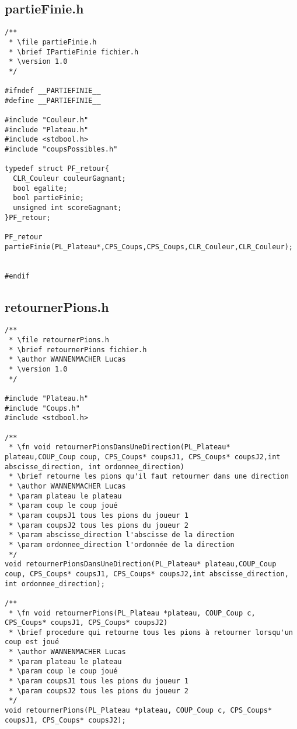 \subsection{partieFinie.h}
\begin{lstlisting}
/**
 * \file partieFinie.h
 * \brief IPartieFinie fichier.h
 * \version 1.0
 */

#ifndef __PARTIEFINIE__
#define __PARTIEFINIE__

#include "Couleur.h"
#include "Plateau.h"
#include <stdbool.h>
#include "coupsPossibles.h"

typedef struct PF_retour{
  CLR_Couleur couleurGagnant;
  bool egalite;
  bool partieFinie;
  unsigned int scoreGagnant;
}PF_retour;

PF_retour partieFinie(PL_Plateau*,CPS_Coups,CPS_Coups,CLR_Couleur,CLR_Couleur);


#endif
\end{lstlisting}

\subsection{retournerPions.h}
\begin{lstlisting}
/**
 * \file retournerPions.h
 * \brief retournerPions fichier.h
 * \author WANNENMACHER Lucas
 * \version 1.0
 */

#include "Plateau.h"
#include "Coups.h"
#include <stdbool.h>

/**
 * \fn void retournerPionsDansUneDirection(PL_Plateau* plateau,COUP_Coup coup, CPS_Coups* coupsJ1, CPS_Coups* coupsJ2,int abscisse_direction, int ordonnee_direction)
 * \brief retourne les pions qu'il faut retourner dans une direction
 * \author WANNENMACHER Lucas
 * \param plateau le plateau
 * \param coup le coup joué
 * \param coupsJ1 tous les pions du joueur 1
 * \param coupsJ2 tous les pions du joueur 2
 * \param abscisse_direction l'abscisse de la direction
 * \param ordonnee_direction l'ordonnée de la direction
 */
void retournerPionsDansUneDirection(PL_Plateau* plateau,COUP_Coup coup, CPS_Coups* coupsJ1, CPS_Coups* coupsJ2,int abscisse_direction, int ordonnee_direction);

/**
 * \fn void retournerPions(PL_Plateau *plateau, COUP_Coup c, CPS_Coups* coupsJ1, CPS_Coups* coupsJ2)
 * \brief procedure qui retourne tous les pions à retourner lorsqu'un coup est joué
 * \author WANNENMACHER Lucas
 * \param plateau le plateau
 * \param coup le coup joué
 * \param coupsJ1 tous les pions du joueur 1
 * \param coupsJ2 tous les pions du joueur 2
 */
void retournerPions(PL_Plateau *plateau, COUP_Coup c, CPS_Coups* coupsJ1, CPS_Coups* coupsJ2);
  
\end{lstlisting}

